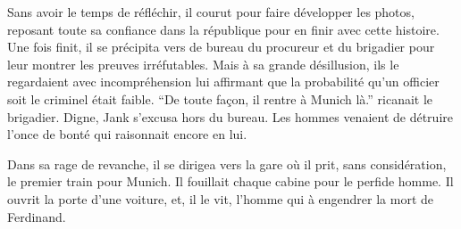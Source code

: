 Sans avoir le temps de réfléchir, il courut pour faire développer les photos, reposant toute sa confiance dans la république pour en finir avec cette histoire.
Une fois finit, il se précipita vers de bureau du procureur et du brigadier pour leur montrer les preuves irréfutables.
Mais à sa grande désillusion, ils le regardaient avec incompréhension lui affirmant que la probabilité qu'un officier soit le criminel était faible.
\enquote{De toute façon, il rentre à Munich là.} ricanait le brigadier. 
Digne, Jank s'excusa hors du bureau. 
Les hommes venaient de détruire l'once de bonté qui raisonnait encore en lui.

Dans sa rage de revanche, il se dirigea vers la gare où il prit, sans considération, le premier train pour Munich.
Il fouillait chaque cabine pour le perfide homme.
Il ouvrit la porte d'une voiture, et, il le vit, l'homme qui à engendrer la mort de Ferdinand.

